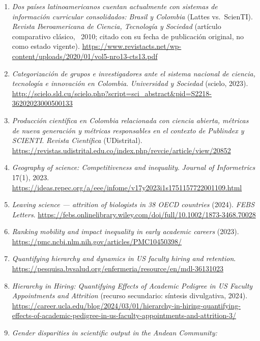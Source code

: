 \begin{enumerate}
  \item \emph{Dos países latinoamericanos cuentan actualmente con sistemas de
        información curricular consolidados: Brasil y Colombia} (Lattes vs.\
        ScienTI). \emph{Revista Iberoamericana de Ciencia, Tecnología y
        Sociedad} (artículo comparativo clásico, ~2010; citado con su fecha de
        publicación original, no como estado vigente).
        \url{https://www.revistacts.net/wp-content/uploads/2020/01/vol5-nro13-cts13.pdf}
  \item \emph{Categorización de grupos e investigadores ante el sistema
        nacional de ciencia, tecnología e innovación en Colombia}.
        \emph{Universidad y Sociedad} (scielo, 2023).
        \url{http://scielo.sld.cu/scielo.php?script=sci_abstract&pid=S2218-36202023000500133}
  \item \emph{Producción científica en Colombia relacionada con ciencia
        abierta, métricas de nueva generación y métricas responsables en el
        contexto de Publindex y SCIENTI}. \emph{Revista Científica}
        (UDistrital). \url{https://revistas.udistrital.edu.co/index.php/revcie/article/view/20852}
  \item \emph{Geography of science: Competitiveness and inequality}. \emph{Journal
        of Informetrics} 17(1), 2023.
        \url{https://ideas.repec.org/a/eee/infome/v17y2023i1s1751157722001109.html}
  \item \emph{Leaving science — attrition of biologists in 38 OECD countries}
        (2024). \emph{FEBS Letters}.
        \url{https://febs.onlinelibrary.wiley.com/doi/full/10.1002/1873-3468.70028}
  \item \emph{Ranking mobility and impact inequality in early academic careers}
        (2023). \url{https://pmc.ncbi.nlm.nih.gov/articles/PMC10450398/}
  \item \emph{Quantifying hierarchy and dynamics in US faculty hiring and
        retention}. \url{https://pesquisa.bvsalud.org/enfermeria/resource/en/mdl-36131023}
  \item \emph{Hierarchy in Hiring: Quantifying Effects of Academic Pedigree in
        US Faculty Appointments and Attrition} (recurso secundario: síntesis
        divulgativa, 2024).
        \url{https://career.ucla.edu/blog/2024/03/01/hierarchy-in-hiring-quantifying-effects-of-academic-pedigree-in-us-faculty-appointments-and-attrition-3/}
  \item \emph{Gender disparities in scientific output in the Andean Community:
}
\end{enumerate}

